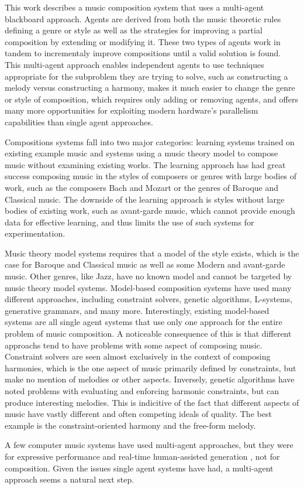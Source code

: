 This work describes a music composition system that uses a multi-agent blackboard approach.
Agents are derived from both the music theoretic rules defining a genre or style as well as the strategies for improving a partial composition by extending or modifying it.
These two types of agents work in tandem to incrementaly improve compositions until a valid solution is found.
This multi-agent approach enables independent agents to use techniques appropriate for the subproblem they are trying to solve, such as constructing a melody versus constructing a harmony,
makes it much easier to change the genre or style of composition, which requires only adding or removing agents,
and offers many more opportunities for exploiting modern hardware's parallelism capabilities than single agent approaches.

Compositions systems fall into two major categories: learning systems trained on existing example music and systems using a music theory model to compose music without examining existing works.
The learning approach has had great success composing music in the styles of composers or genres with large bodies of work, such as the composers Bach and Mozart or the genres of Baroque and Classical music.
\cite{Cope2004,Edwards2011,Papadopoulos1999}
The downside of the learning approach is styles without large bodies of existing work, such as avant-garde music, 
which cannot provide enough data for effective learning, and thus limits the use of such systems for experimentation.

Music theory model systems requires that a model of the style exists, which is the case for Baroque and Classical music as well as some Modern and avant-garde music.
Other genres, like Jazz, have no known model and cannot be targeted by music theory model systems.
Model-based composition systems have used many different approaches, including constraint solvers, genetic algorithms, L-systems, generative grammars, and many more.
\cite{Anders2010, Burton1999, Edwards2011, Pachet, Papadopoulos1999, Sandred2010}
Interestingly, existing model-based systems are all single agent systems that use only one approach for the entire problem of music composition.
A noticeable consequence of this is that different approachs tend to have problems with some aspect of composing music.
Constraint solvers are seen almost exclusively in the context of composing harmonies, which is the one aspect of music primarily defined by constraints, but make no mention of melodies or other aspects.
\cite{Anders2010, Pachet, Sandred2010}
Inversely, genetic algorithms have noted problems with evaluating and enforcing harmonic constraints, but can produce interesting melodies.
\cite{Burton1999}
This is indicitive of the fact that different aspects of music have vastly different and often competing ideals of quality.
The best example is the constraint-oriented harmony and the free-form melody.

A few computer music systems have used multi-agent approaches, but they were for expressive performance \cite{Miranda2010} and real-time human-assisted generation \cite{Eigenfeldt2009}, not for composition.
Given the issues single agent systems have had, a multi-agent approach seems a natural next step.
